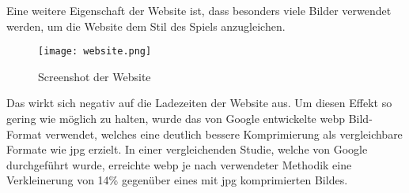 Eine weitere Eigenschaft der \FF Website ist, dass besonders viele Bilder verwendet werden, um die Website dem Stil des
Spiels anzugleichen.

\begin{figure}[H]
    \centering
    \texttt{[image: website.png]}
    \caption{Screenshot der Website}
\end{figure}

Das wirkt sich negativ auf die Ladezeiten der Website aus.
Um diesen Effekt so gering wie möglich zu halten, wurde das von Google entwickelte webp Bild-Format verwendet, welches
eine deutlich bessere Komprimierung als vergleichbare Formate wie \zB jpg erzielt.
In einer vergleichenden Studie, welche von Google durchgeführt wurde, erreichte webp je nach verwendeter Methodik eine
Verkleinerung von 14\% gegenüber eines mit jpg komprimierten Bildes.

\vfill
\pagebreak

\renewcommand{\kapitelautor}{}
